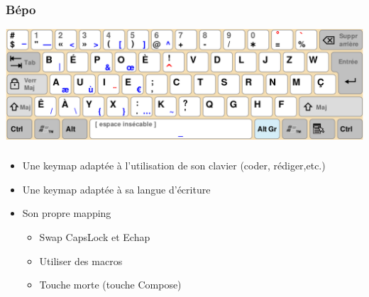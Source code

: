 \documentclass[c,12pt]{beamer}
\begin{document}
\begin{frame}
	\frametitle{Bépo}
	\begin{center}
		\includegraphics[scale=0.26]{Bepo.png}
	\end{center}
\end{frame}

\begin{frame}
	\frametitle{\subsecname}
	\begin{itemize}
		\item{Une keymap adaptée à l'utilisation de son clavier (coder,
			rédiger,etc.)}
		\item<1->{Une keymap adaptée à sa langue d'écriture}
		\item<2->{Son propre mapping}
			\begin{itemize}
				\item{Swap CapsLock et Echap}
				\item{Utiliser des macros}
				\item{Touche morte (touche Compose)}
			\end{itemize}
	\end{itemize}
\end{frame}
\end{document}

